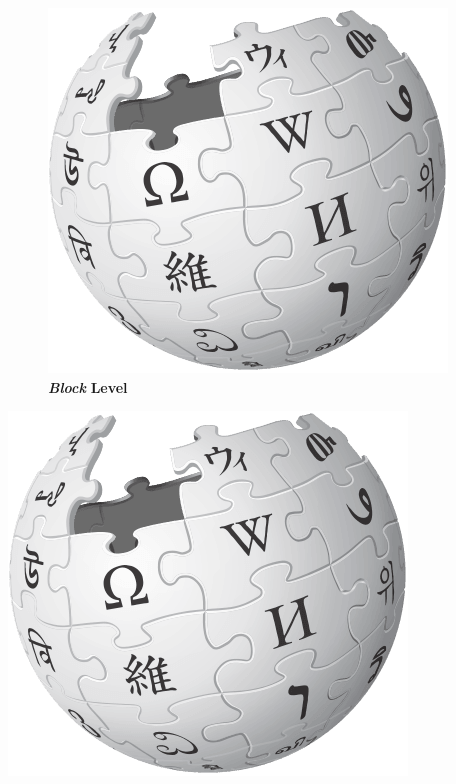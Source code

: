 \begin{figure}[htbp]
\centering
\includegraphics[keepaspectratio,width=\textwidth,height=0.75\textheight]{image.png}
\caption{\textbf{\emph{Block}} \textbf{Level}}
\end{figure}

\includegraphics[keepaspectratio,width=\textwidth,height=0.75\textheight]{image.png}


